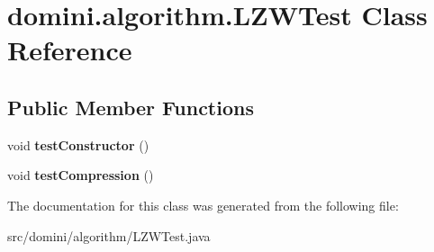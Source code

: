 \hypertarget{classdomini_1_1algorithm_1_1LZWTest}{}\section{domini.\+algorithm.\+L\+Z\+W\+Test Class Reference}
\label{classdomini_1_1algorithm_1_1LZWTest}
\subsection*{Public Member Functions}
\begin{DoxyCompactItemize}
\item 
\mbox{\label{classdomini_1_1algorithm_1_1LZWTest_a7c9c06d11571cf8ebcaff5404c920e30}} 
void {\bfseries test\+Constructor} ()
\item 
\mbox{\label{classdomini_1_1algorithm_1_1LZWTest_a83d521e2900616a43a01e02fc54e6e02}} 
void {\bfseries test\+Compression} ()
\end{DoxyCompactItemize}


The documentation for this class was generated from the following file\+:\begin{DoxyCompactItemize}
\item 
src/domini/algorithm/L\+Z\+W\+Test.\+java\end{DoxyCompactItemize}
